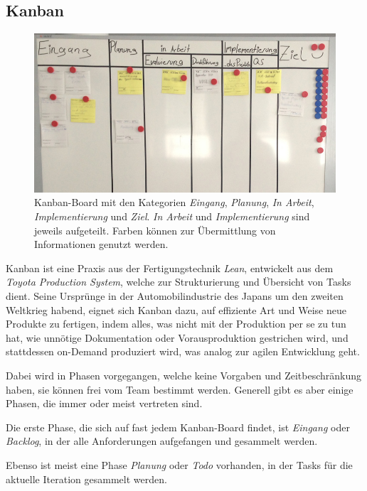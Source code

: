 	\subsection{Kanban}
		\label{ssec:kanban}
		\begin{figure}[ht]
			\begin{center}
				\includegraphics[width=\textwidth]{images/kanban-board.jpg}
				\caption{Kanban-Board mit den Kategorien \textit{Eingang}, \textit{Planung}, \textit{In Arbeit}, \textit{Implementierung} und \textit{Ziel}. \textit{In Arbeit} und \textit{Implementierung} sind jeweils aufgeteilt. Farben können zur Übermittlung von Informationen genutzt werden.}
				\label{img:kanban}
			\end{center}
		\end{figure}
		Kanban ist eine Praxis aus der Fertigungstechnik \textit{Lean}, entwickelt aus dem \textit{Toyota Production System}, welche zur Strukturierung und Übersicht von Tasks dient.
		Seine Ursprünge in der Automobilindustrie des Japans um den zweiten Weltkrieg habend, eignet sich Kanban dazu, auf effiziente Art und Weise neue Produkte zu fertigen, indem alles, was nicht mit der Produktion per se zu tun hat, wie unnötige Dokumentation oder Vorausproduktion gestrichen wird, und stattdessen on-Demand produziert wird, was analog zur agilen Entwicklung geht.
		
		Dabei wird in Phasen vorgegangen, welche keine Vorgaben und Zeitbeschränkung haben, sie können frei vom Team bestimmt werden.
		Generell gibt es aber einige Phasen, die immer oder meist vertreten sind.
		
		Die erste Phase, die sich auf fast jedem Kanban-Board findet, ist \textit{Eingang} oder \textit{Backlog}, in der alle Anforderungen aufgefangen und gesammelt werden.
		
		Ebenso ist meist eine Phase \textit{Planung} oder \textit{Todo} vorhanden, in der Tasks für die aktuelle Iteration gesammelt werden.
		
